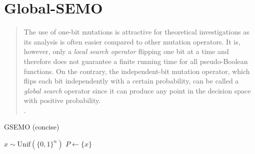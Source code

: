 \documentclass[a4paper, 11pt]{report}
\theoremstyle{remark}
\begin{document}
\section{Global-SEMO}
    \begin{quote}
        The use of one-bit mutations is attractive for theoretical investigations as its analysis is often easier compared to other mutation operators. It
        is, however, only a \emph{local search operator} flipping one bit at a time and therefore does not guarantee a finite running time for all pseudo-Boolean
        functions. On the contrary, the independent-bit mutation operator, which flips each bit independently with a certain probability, can be called a 
        \emph{global search} operator since it can produce any point in the decision space with positive probability.\\
        \cite{laumanns2004running}.
    \end{quote}
    \begin{algorithm}[H]
        \caption{GSEMO (concise)}
        $x \sim \mathrm{Unif}(\{0,1\}^n)$\;
        $P \gets \{x\}$\;
    \end{algorithm}
\end{document}
